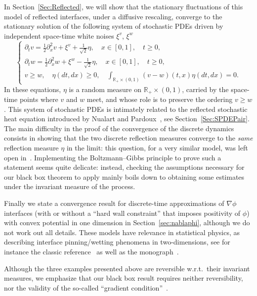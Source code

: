 \documentclass[AHL,Unicode,longabstracts]{cedram}
\theoremstyle{plain}
\newcommand{\R}{\mathbb{R}}
\begin{document}
In Section~\ref{Sec:Reflected}, we will show that the stationary fluctuations of this model of reflected interfaces, under a diffusive rescaling, converge to the stationary solution of the following system of stochastic PDEs driven by independent space-time white noises $\xi^v$, $\xi^w$
\begin{equation}
\begin{cases}
\partial_t v = \frac12\partial^2_x v + \xi^v + \frac1{\sqrt 2}\eta,\quad x\in [0,1],\quad t\ge 0,\\
\partial_t w = \frac12\partial^2_x w + \xi^w - \frac1{\sqrt 2}\eta,\quad x\in [0,1],\quad t\ge 0,\\
v\ge w,\quad \eta(dt,dx)\ge 0,\quad \int_{\R_+ \times (0,1)} (v-w)(t,x) \eta(dt,dx) = 0.
\end{cases}
\end{equation}
In these equations, $\eta$ is a random measure on $\R_+\times (0,1)$, carried by the space-time points where $v$ and $w$ meet, and whose role is to preserve the ordering $v\geq w$. This system of stochastic PDEs is intimately related to the reflected stochastic heat equation introduced by Nualart and Pardoux~\cite{NualartPardoux92}, see Section~\ref{Sec:SPDEPair}. The main difficulty in the proof of the convergence of the discrete dynamics consists in showing that the two discrete reflection measures converge to the \emph{same} reflection measure $\eta$ in the limit: this question, for a very similar model, was left open in~\cite{EthLab}. Implementing the Boltzmann--Gibbs principle to prove such a statement seems quite delicate: instead, checking the assumptions necessary for our black box theorem to apply mainly boils down to obtaining some estimates under the invariant measure of the process.

Finally we state a convergence result for discrete-time approximations of $\nabla\phi$ interfaces (with or without a ``hard wall constraint'' that imposes positivity of $\phi$) with convex potential in one dimension in Section~\ref{sec:nablaphi}, although we do not work out all details. These models have relevance in statistical physics, as describing interface pinning/wetting phenomena in two-dimensions, see for instance the classic reference~\cite{Fisher} as well as the monograph~\cite{Giacominbook}.

Although the three examples presented above are reversible w.r.t.~their invariant measures, we emphasize that our black box result requires neither reversibility, nor the validity of the so-called ``gradient condition''~\cite{KipLan}.
\end{document}
